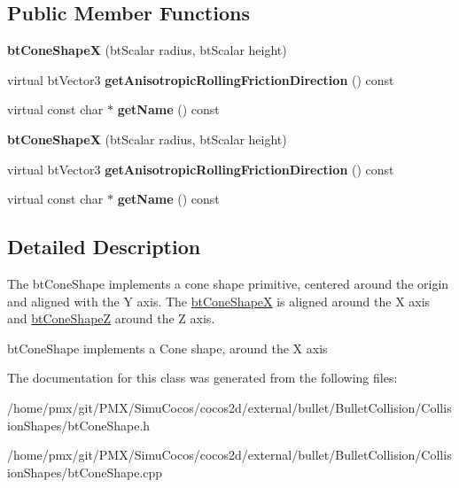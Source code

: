 \subsection*{Public Member Functions}
\begin{DoxyCompactItemize}
\item 
\mbox{\label{classbtConeShapeX_a2c800200020a99d63914876c8343ca03}} 
{\bfseries bt\+Cone\+ShapeX} (bt\+Scalar radius, bt\+Scalar height)
\item 
\mbox{\label{classbtConeShapeX_ac122bef551f4db9ec53656c3c40dc6c5}} 
virtual bt\+Vector3 {\bfseries get\+Anisotropic\+Rolling\+Friction\+Direction} () const
\item 
\mbox{\label{classbtConeShapeX_af8c0bbbd8a010815dcf5960e03ba1e60}} 
virtual const char $\ast$ {\bfseries get\+Name} () const
\item 
\mbox{\label{classbtConeShapeX_a2c800200020a99d63914876c8343ca03}} 
{\bfseries bt\+Cone\+ShapeX} (bt\+Scalar radius, bt\+Scalar height)
\item 
\mbox{\label{classbtConeShapeX_ac122bef551f4db9ec53656c3c40dc6c5}} 
virtual bt\+Vector3 {\bfseries get\+Anisotropic\+Rolling\+Friction\+Direction} () const
\item 
\mbox{\label{classbtConeShapeX_af8c0bbbd8a010815dcf5960e03ba1e60}} 
virtual const char $\ast$ {\bfseries get\+Name} () const
\end{DoxyCompactItemize}


\subsection{Detailed Description}
The bt\+Cone\+Shape implements a cone shape primitive, centered around the origin and aligned with the Y axis. The \hyperlink{classbtConeShapeX}{bt\+Cone\+ShapeX} is aligned around the X axis and \hyperlink{classbtConeShapeZ}{bt\+Cone\+ShapeZ} around the Z axis. 

bt\+Cone\+Shape implements a Cone shape, around the X axis 

The documentation for this class was generated from the following files\+:\begin{DoxyCompactItemize}
\item 
/home/pmx/git/\+P\+M\+X/\+Simu\+Cocos/cocos2d/external/bullet/\+Bullet\+Collision/\+Collision\+Shapes/bt\+Cone\+Shape.\+h\item 
/home/pmx/git/\+P\+M\+X/\+Simu\+Cocos/cocos2d/external/bullet/\+Bullet\+Collision/\+Collision\+Shapes/bt\+Cone\+Shape.\+cpp\end{DoxyCompactItemize}
